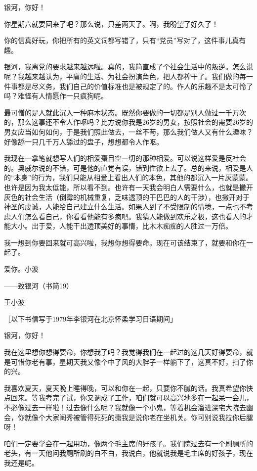 银河，你好！ 

你星期六就要回来了吧？那么说，只差两天了。啊，我盼望了好久了！ 

你的信真好玩，你把所有的英文词都写错了，只有“党员”写对了，这件事儿真有趣。 

银河，我离党的要求越来越远啦。真的，我简直成了个社会生活中的叛逆。怎么说呢？我越来越认为，平庸的生活、为社会扮演角色，把人都榨干了。我们做的每一件事都是尽义务，我们自己的价值标准也是被规定了的。作人的乐趣不是太可怜了吗？难怪有人情愿作一只疯狗呢。 

最可憎的是人就此沉入一种麻木状态。既然你要做的一切都是别人做过一千万次的，那么这事还不令人作呕吗？比方说你我是26岁的男女，按照社会的需要26岁的男女应当如何如何，于是我们照此做去，一丝不苟，那么我们做人又有什么趣味？好像舔一只几千万人舔过的盘子，想想都令人作呕。 

我现在一拿笔就想写人们的相爱棗目空一切的那种相爱。可以说这样爱是反社会的。奥威尔说的不错，可是他的直觉有误，错到性欲上去了。总的来说，相爱是人的“本身”的行为，我们只能从相爱上看出人们的本色，其他的都沉入一片灰蒙蒙。也许是因为我太低能，所以看不到。也许有一天我会明白人需要什么，也就是撇开灰色的社会生活（倒霉的机械重复，乏味透顶的干巴巴的人的干涉），也撇开对于神圣的虔诚，人能给自己建立什么生活。如果人到了不受限制的情境，一点也不考虑人们怎么看自己，你看看他能有多疯吧。我猜人能做到欢乐之极，这也看人的才能大小。出于爱，人能干出透顶美好的事情，比木木痴痴的人胜过一万倍。 

我一想到你要回来就可高兴啦，我想你想得要命。现在可该结束了，就要和你在一起了。 

爱你。小波 





——致银河（书简19） 

王小波 

［以下书信写于1979年李银河在北京怀柔学习日语期间」 

银河，你好！ 

我在这里想你想得要命，你想我了吗？我觉得我们在一起过的这几天好得要命，就是可惜你老有事，星期天我又像个中了风的大胖子一样躺下了，这真不好，扫了你的兴。 

我喜欢夏天，夏天晚上睡得晚，可以和你在一起，只要你不腻的话。我真希望你快点回来。等我考完了试，你又调成了工作，咱们就可以高兴地多在一起呆一会儿，不必像过去一样啦！过去像什么呢？我就像一个小鬼，等着机会溜进深宅大院去幽会，你就像个大家闺秀被管得死死的棗我是说你老在坐机关。你可别说我拉你后腿呀！ 

咱们一定要学会在一起用功，像两个毛主席的好孩子。我们院过去有一个刷厕所的老头，有一天他问我厕所刷的白不白，我说白，他就说我是毛主席的好孩子，现在我还是呢。 

